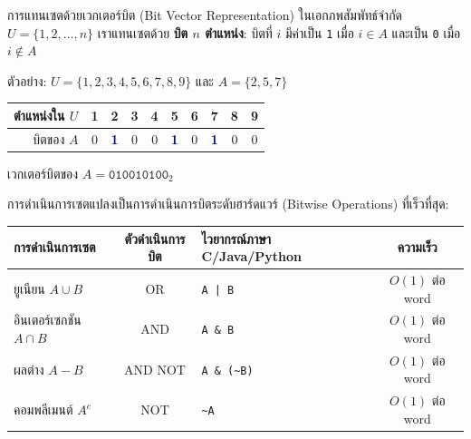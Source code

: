 \begin{frame}{การแทนเซตด้วยเวกเตอร์บิต (Bit Vector Representation)}
  ในเอกภพสัมพัทธ์จำกัด $U = \{1, 2, \ldots, n\}$ เราแทนเซตด้วย \textbf{บิต $n$ ตำแหน่ง}:
  บิตที่ $i$ มีค่าเป็น \texttt{1} เมื่อ $i \in A$ และเป็น \texttt{0} เมื่อ $i \notin A$
  \begin{block}{ตัวอย่าง: $U = \{1, 2, 3, 4, 5, 6, 7, 8, 9\}$ และ $A = \{2, 5, 7\}$}
    \centering
    \begin{tabular}{r|ccccccccc}
      ตำแหน่งใน $U$ & 1 & 2 & 3 & 4 & 5 & 6 & 7 & 8 & 9 \\ \hline
      บิตของ $A$ & 0 & \textbf{\textcolor{navy}{1}} & 0 & 0 & \textbf{\textcolor{navy}{1}} & 0 & \textbf{\textcolor{navy}{1}} & 0 & 0 \\
    \end{tabular}
    \par\vspace{0.2em} เวกเตอร์บิตของ $A = \texttt{010010100}_2$
  \end{block}
  \vspace{0.2em}
  การดำเนินการเซตแปลงเป็นการดำเนินการบิตระดับฮาร์ดแวร์ (Bitwise Operations) ที่เร็วที่สุด:
  \begin{center}\small
  \begin{tabular}{|l|c|l|c|}
    \hline
    \textbf{การดำเนินการเซต} & \textbf{ตัวดำเนินการบิต} & \textbf{ไวยากรณ์ภาษา C/Java/Python} & \textbf{ความเร็ว} \\ \hline
    ยูเนียน $A \cup B$ & OR & \texttt{A | B} & $O(1)$ ต่อ word \\ \hline
    อินเตอร์เซกชัน $A \cap B$ & AND & \texttt{A \& B} & $O(1)$ ต่อ word \\ \hline
    ผลต่าง $A - B$ & AND NOT & \texttt{A \& (\textasciitilde B)} & $O(1)$ ต่อ word \\ \hline
    คอมพลีเมนต์ $A^c$ & NOT & \texttt{\textasciitilde A} & $O(1)$ ต่อ word \\ \hline
  \end{tabular}
  \end{center}
\end{frame}

